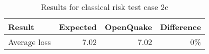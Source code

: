 \begin{table}[htbp]

\centering
\begin{tabular}{ l r r r }

\hline
\rowcolor{anti-flashwhite}
\bf{Result} & \bf{Expected} & \bf{OpenQuake} & \bf{Difference}\\
\hline
Average loss & 7.02 & 7.02 & 0\% \\
\hline
\end{tabular}

\caption{Results for classical risk test case 2c}
\label{tab:result-cr-2c}
\end{table}